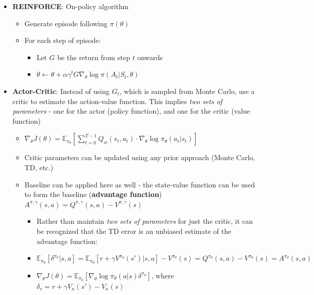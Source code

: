 \documentclass[twocolumn]{article}
\providecommand{\tightlist}{%
  \setlength{\itemsep}{\GlobalItemSep}\setlength{\parskip}{\GlobalListParSkip}}
\newlength{\GlobalItemSep}
\newlength{\GlobalListParSkip}
\begin{document}
\begin{itemize}
  \begin{itemize}
  \tightlist
  \item
    \(\nabla_\theta J(\theta) = \mathbb{E}_\tau [\sum_{t=0}^{T-1} (G_t - b) \cdot \nabla_\theta \log \pi_\theta (a_t | s_t)]\)
    where \(b = \mathbb{E} [r_t + r_{t+1} + ... + r_{T-1}]\) (expected
    return)
  \end{itemize}
\item
  \textbf{REINFORCE}: On-policy algorithm

  \begin{itemize}
  \tightlist
  \item
    Generate episode following \(\pi(\theta)\)
  \item
    For each step of episode:

    \begin{itemize}
    \tightlist
    \item
      Let \(G\) be the return from step \(t\) onwards
    \item
      \(\theta \leftarrow \theta + \alpha \gamma^t G \nabla_\theta \log \pi (A_t | S_t, \theta)\)
    \end{itemize}
  \end{itemize}
\item
  \textbf{Actor-Critic}: Instead of using \(G_t\), which is sampled from
  Monte Carlo, use a critic to estimate the action-value function. This
  implies \emph{two sets of parameters} - one for the actor (policy
  function), and one for the critic (value function)

  \begin{itemize}
  \tightlist
  \item
    \(\nabla_\theta J(\theta) = \mathbb{E}_{\pi_\theta} [\sum_{t=0}^{T-1} Q_w (s_t, a_t) \cdot \nabla_\theta \log \pi_\theta (a_t | s_t)]\)
  \item
    Critic parameters can be updated using any prior approach (Monte
    Carlo, TD, etc.)
  \item
    Baseline can be applied here as well - the state-value function can
    be used to form the baseline (\textbf{advantage function})
    \(A^{\pi, \gamma}(s,a) = Q^{\pi, \gamma}(s, a) - V^{\pi, \gamma}(s)\)

    \begin{itemize}
    \tightlist
    \item
      Rather than maintain \emph{two sets of parameters} for just the
      critic, it can be recognized that the TD error is an unbiased
      estimate of the advantage function:
    \item
      \(\mathbb{E}_{\pi_\theta}[\delta^{\pi_\theta} | s, a] = \mathbb{E}_{\pi_\theta} [r + \gamma V^{\pi_\theta}(s') |s, a] - V^{\pi_\theta}(s) = Q^{\pi_\theta}(s, a) - V^{\pi_\theta}(s) = A^{\pi_\theta}(s,a)\)
    \item
      \(\nabla_\theta J(\theta) = \mathbb{E}_{\pi_\theta}[\nabla_\theta \log \pi_\theta (a |s)\delta^{\pi_\theta}]\),
      where \(\delta_v = r + \gamma V_{\kappa}(s') - V_\kappa (s)\)


\end{itemize}
\end{itemize}
\end{itemize}
\end{document}
